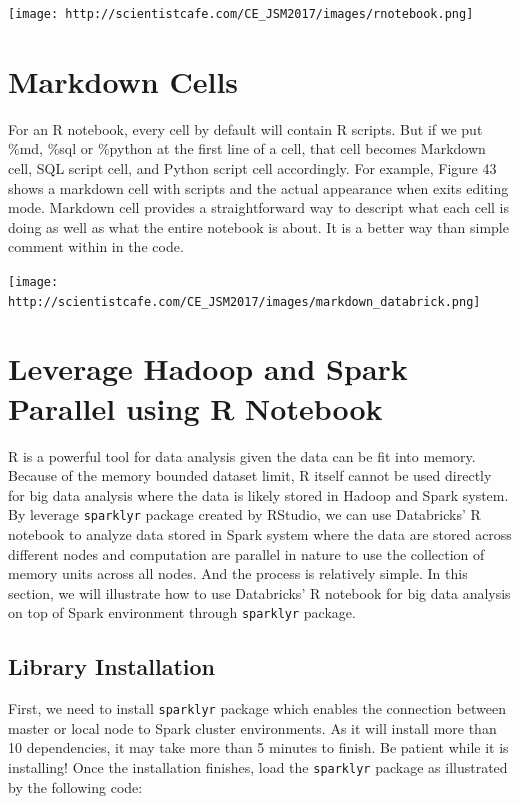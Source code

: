 \documentclass[]{book}
\theoremstyle{definition}
\theoremstyle{definition}
\theoremstyle{remark}
\begin{document}
\texttt{[image: http://scientistcafe.com/CE\_JSM2017/images/rnotebook.png]}

\section{Markdown Cells}\label{markdown-cells}

For an R notebook, every cell by default will contain R scripts. But if
we put \%md, \%sql or \%python at the first line of a cell, that cell
becomes Markdown cell, SQL script cell, and Python script cell
accordingly. For example, Figure 43 shows a markdown cell with scripts
and the actual appearance when exits editing mode. Markdown cell
provides a straightforward way to descript what each cell is doing as
well as what the entire notebook is about. It is a better way than
simple comment within in the code.

\texttt{[image: http://scientistcafe.com/CE\_JSM2017/images/markdown\_databrick.png]}

\section{Leverage Hadoop and Spark Parallel using R
Notebook}\label{leverage-hadoop-and-spark-parallel-using-r-notebook}

R is a powerful tool for data analysis given the data can be fit into
memory. Because of the memory bounded dataset limit, R itself cannot be
used directly for big data analysis where the data is likely stored in
Hadoop and Spark system. By leverage \texttt{sparklyr} package created
by RStudio, we can use Databricks' R notebook to analyze data stored in
Spark system where the data are stored across different nodes and
computation are parallel in nature to use the collection of memory units
across all nodes. And the process is relatively simple. In this section,
we will illustrate how to use Databricks' R notebook for big data
analysis on top of Spark environment through \texttt{sparklyr} package.

\subsection{Library Installation}\label{library-installation}

First, we need to install \texttt{sparklyr} package which enables the
connection between master or local node to Spark cluster environments.
As it will install more than 10 dependencies, it may take more than 5
minutes to finish. Be patient while it is installing! Once the
installation finishes, load the \texttt{sparklyr} package as illustrated
by the following code:
\end{document}
